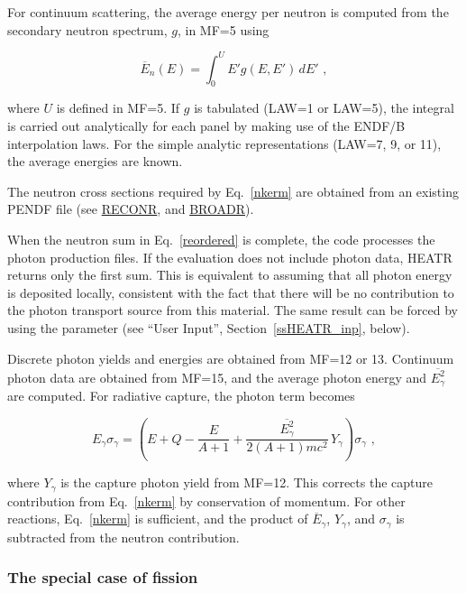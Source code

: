 For continuum scattering, the average energy per neutron is
computed from the secondary neutron spectrum, $g$, in MF=5 using

\begin{equation}
   \overline{E}_n(E)=\int_0^U E'g(E,E')\,dE'\,\,,
\end{equation}

\noindent
where $U$ is defined in MF=5.  If $g$ is tabulated (LAW=1 or
LAW=5), the integral is carried out analytically for each panel
by making use of the ENDF/B interpolation laws.  For the simple
analytic representations (LAW=7, 9, or 11), the average energies
are known\cite{ENDF102}.

The neutron cross sections required by Eq.~\ref{nkerm} are
obtained from an existing PENDF file (see
\hyperlink{sRECONRhy}{RECONR},
and \hyperlink{sBROADRhy}{BROADR}).

When the neutron sum in Eq.~\ref{reordered} is complete, the
code processes the photon production files.  If the evaluation
does not include photon data, HEATR returns only the first sum.
This is equivalent to assuming that all photon energy is
deposited locally, consistent with the fact that there will
be no contribution to the photon transport source from this
material.  The same result can be forced by using the
 parameter (see ``User Input'', Section~\ref{ssHEATR_inp}, below).

Discrete photon yields and energies are obtained from
MF=12 or 13.  Continuum photon data are obtained from MF=15,
and the average photon energy and $\overline{E_\gamma^2}$ are
computed.  For radiative capture, the photon term becomes

\begin{equation}
   E_\gamma\sigma_\gamma=\left(E+Q-\frac{E}{A+1}
    +\frac{\overline{E_\gamma^2}}{2(A+1)mc^2}\,Y_\gamma\right)
    \sigma_\gamma\,\,,
\label{cfix}
\end{equation}

\noindent
\cite{ENDF102}
where $Y_\gamma$ is the capture photon yield from MF=12.  This
corrects the capture contribution from Eq.~\ref{nkerm} by
conservation of momentum.  For other reactions,
Eq.~\ref{nkerm} is sufficient, and the product of
$\overline{E}_\gamma$, $Y_\gamma$, and $\sigma_\gamma$ is
subtracted from the neutron contribution.

\subsubsection{The special case of fission}
\label{sssHEATR_fissionKERMA}

